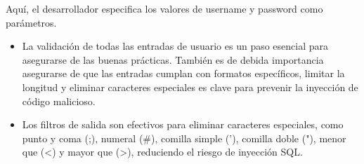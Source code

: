 \documentclass[11pt]{report}
\begin{document}
Aquí, el desarrollador especifica los valores de username y password como parámetros.
\begin{itemize}
  \item La validación de todas las entradas de usuario es un paso esencial para asegurarse de las buenas
  prácticas. También es de debida importancia asegurarse de que las entradas cumplan con formatos específicos,
  limitar la longitud y eliminar caracteres especiales es clave para prevenir la inyección de código malicioso.
  
  \item Los filtros de salida son efectivos para eliminar caracteres especiales, como punto y coma (;), numeral (\#),
  comilla simple ('), comilla doble ("), menor que (<) y mayor que (>), reduciendo el riesgo de inyección SQL.
\end{itemize}

\cleardoublepage
\end{document}
